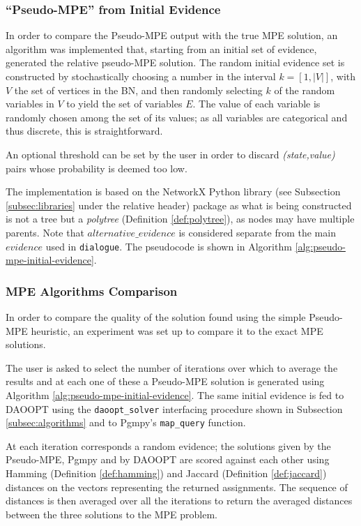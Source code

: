 \subsubsection{\enquote{Pseudo-MPE} from Initial Evidence} \label{subsubsec:pseudo-mpe}
In order to compare the Pseudo-MPE output with the true MPE solution, an algorithm was implemented that, starting from an initial set of evidence, generated the relative pseudo-MPE solution.
The random initial evidence set is constructed by stochastically choosing a number in the interval $k = [ 1, |V| ]$, with $V$ the set of vertices in the BN, and then randomly selecting $k$ of the random variables in $V$ to yield the set of variables $E$.
The value of each variable is randomly chosen among the set of its values; as all variables are categorical and thus discrete, this is straightforward.

An optional threshold can be set by the user in order to discard \textit{(state,value)} pairs whose probability is deemed too low.

The implementation is based on the NetworkX Python library (see Subsection \ref{subsec:libraries} under the relative header) package as what is being constructed is not a tree but a \textit{polytree} (Definition \ref{def:polytree}), as nodes may have multiple parents.
Note that $alternative\_evidence$ is considered separate from the main $evidence$ used in \texttt{dialogue}.
The pseudocode is shown in Algorithm \ref{alg:pseudo-mpe-initial-evidence}.

\subsubsection{MPE Algorithms Comparison}
In order to compare the quality of the solution found using the simple Pseudo-MPE heuristic, an experiment was set up to compare it to the exact MPE solutions.

The user is asked to select the number of iterations over which to average the results and at each one of these a Pseudo-MPE solution is generated using Algorithm \ref{alg:pseudo-mpe-initial-evidence}.
The same initial evidence is fed to DAOOPT using the \texttt{daoopt\_solver} interfacing procedure shown in Subsection \ref{subsec:algorithms} and to Pgmpy's \texttt{map\_query} function.

At each iteration corresponds a random evidence; the solutions given by the Pseudo-MPE, Pgmpy and by DAOOPT are scored against each other using Hamming (Definition \ref{def:hamming}) and Jaccard (Definition \ref{def:jaccard}) distances on the vectors representing the returned assignments.
The sequence of distances is then averaged over all the iterations to return the averaged distances between the three solutions to the MPE problem.

